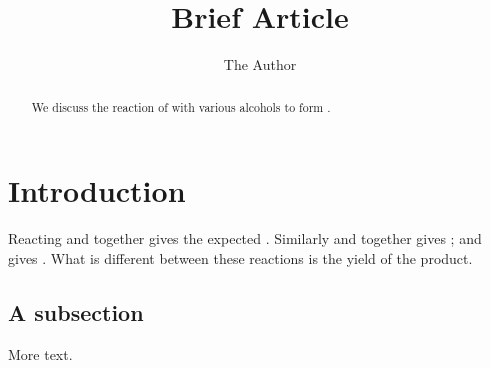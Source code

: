\documentclass[11pt]{article} %
\title{Brief Article}
\author{The Author}
\begin{document}
\maketitle


\begin{abstract}
We discuss the reaction of  with various alcohols to form .
\end{abstract}

\section{Introduction}

Reacting  and  together gives the expected .
Similarly  and  together gives ;   
and  gives . What is different between these reactions is the 
yield of the product.

\subsection{A subsection}

More text.
\end{document}
